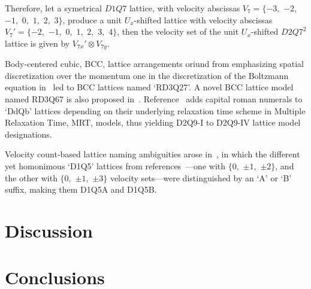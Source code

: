     Therefore, let a symetrical $D1Q7$ lattice, with velocity abscissas $V_7 = \{-3,$ $-2,$ $-1,$ $0,$ $1,$ $2,$ $3\}$,  produce
    a unit $U_x$-shifted lattice with velocity abscissas $V_7' = \{-2,$ $-1,$ $0,$ $1,$ $2,$ $3,$ $4\}$, then the  velocity  set
    of the unit $U_x$-shifted $D2Q7^2$ lattice is given by $V_{7x}' \otimes V_{7y}$.

    Body-centered cubic, BCC, lattice arrangements oriund from emphasizing spatial discretization over the momentum one  in  the
    discretization of the Boltzmann equation in~\cite{2016-NamburiM+AnsumaliS-SciRep} led to  BCC  lattices  named  `RD3Q27'.  A
    novel    BCC    lattice    model    named    RD3Q67    is     also     proposed     in~\cite{2018-AtifM+AnsumaliS-PhysRevE}.
    Reference~\cite{2017-LiL+KlausnerJF-IntJHeatMassTran} adds capital roman numerals to  `DdQb'  lattices  depending  on  their
    underlying relaxation time scheme in Multiple Relaxation Time, MRT, models, thus yielding D2Q9-I to  D2Q9-IV  lattice  model
    designations.

    Velocity count-based lattice naming ambiguities arose in~\cite{2017-PengY+ZhangJM-MathProblEng}, in which the different  yet
    homonimous            `D1Q5'            lattices            from            references~\cite{1998-QianYH+ZhouY-EuroPhysLett,
    2006-ChikatamarlaSS+KarlinIV-PhysRevLett}---one with $\{0,$ $\pm 1,$ $\pm 2\}$, and the other with $\{0,$ $\pm 1,$ $\pm 3\}$
    velocity sets---were distinguished by an `A' or `B' suffix, making them D1Q5A and D1Q5B.



\section{Discussion}



\section{Conclusions}



